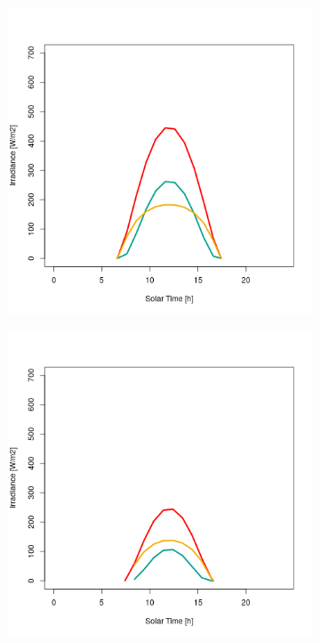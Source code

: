 \begin{figure}[H]
\begin{subfigure}[t]{\subfigureWidth}
  		\label{fig:sub:irradiance-phi-0}
  	\end{subfigure}\\[0.8ex]
    \begin{subfigure}[t]{\subfigureWidth}
      \centering
  		\includegraphics[height=\graphicsHeight]{sections/martian-environment/plots/diurnal-irradiance-variation-3-for-ls-248-phi-20-and-tau-05.png}
  		\label{fig:sub:irradiance-phi-p20}
  	\end{subfigure}\hfill
	   \begin{subfigure}[t]{\subfigureWidth}
      \centering
  		\includegraphics[height=\graphicsHeight]{sections/martian-environment/plots/diurnal-irradiance-variation-4-for-ls-248-phi-40-and-tau-05.png}

\end{subfigure}
\end{figure}
